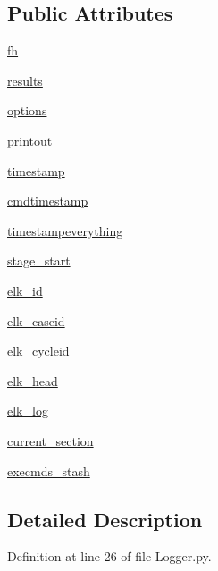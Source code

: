 \subsection*{Public Attributes}
\begin{DoxyCompactItemize}
\item 
\hyperlink{class_logger_1_1_logger_a68875fbff44820c122a69fee38bad238}{fh}
\item 
\hyperlink{class_logger_1_1_logger_accc7402a4ee718e807f3f60d850d2072}{results}
\item 
\hyperlink{class_logger_1_1_logger_a8e881dc46a69491fab52e8fca3d8dd59}{options}
\item 
\hyperlink{class_logger_1_1_logger_abd7bd77ec56ae98c25ff4596ae8ee0ea}{printout}
\item 
\hyperlink{class_logger_1_1_logger_af1d68b73fec8eebd0abeafa3bc8fd98b}{timestamp}
\item 
\hyperlink{class_logger_1_1_logger_a6424ebff90f965d7c6e4e8d7303bc3e2}{cmdtimestamp}
\item 
\hyperlink{class_logger_1_1_logger_a6012f50ab21e5ab3b89465a972b6a99d}{timestampeverything}
\item 
\hyperlink{class_logger_1_1_logger_a639adf5e0d4f73bdb942e9652903231f}{stage\-\_\-start}
\item 
\hyperlink{class_logger_1_1_logger_a14cdba9de890b4ddcd44f89919584663}{elk\-\_\-id}
\item 
\hyperlink{class_logger_1_1_logger_a95ee2cbd3bddd0934dc3f0a839015502}{elk\-\_\-caseid}
\item 
\hyperlink{class_logger_1_1_logger_ab3eee82ef97d6390690a520c92ea6368}{elk\-\_\-cycleid}
\item 
\hyperlink{class_logger_1_1_logger_a6bfefa570074a540e3ec42c8a43a2583}{elk\-\_\-head}
\item 
\hyperlink{class_logger_1_1_logger_a0de302776caf63f84bb88e198dcd8b37}{elk\-\_\-log}
\item 
\hyperlink{class_logger_1_1_logger_a6cfd93e86a2b313df761184fa0661e0a}{current\-\_\-section}
\item 
\hyperlink{class_logger_1_1_logger_aa435d45f90a7c7b6595bbb5c14f9049d}{execmds\-\_\-stash}
\end{DoxyCompactItemize}


\subsection{Detailed Description}


Definition at line 26 of file Logger.\-py.



